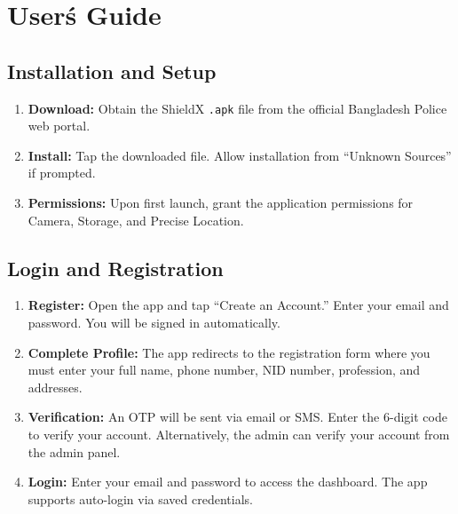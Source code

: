 \documentclass[12pt, a4paper, twoside]{report}
\begin{document}
\chapter{User\'s Guide}
\section*{Installation and Setup}
\begin{enumerate}
    \item[] \textbf{Download:} Obtain the ShieldX \texttt{.apk} file from the official Bangladesh Police web portal.
    \item[] \textbf{Install:} Tap the downloaded file. Allow installation from ``Unknown Sources'' if prompted.
    \item[] \textbf{Permissions:} Upon first launch, grant the application permissions for Camera, Storage, and Precise Location.
\end{enumerate}
\section*{Login and Registration}
\begin{enumerate}
    \item[] \textbf{Register:} Open the app and tap ``Create an Account.'' Enter your email and password. You will be signed in automatically.
    \item[] \textbf{Complete Profile:} The app redirects to the registration form where you must enter your full name, phone number, NID number, profession, and addresses.
    \item[] \textbf{Verification:} An OTP will be sent via email or SMS. Enter the 6-digit code to verify your account. Alternatively, the admin can verify your account from the admin panel.
    \item[] \textbf{Login:} Enter your email and password to access the dashboard. The app supports auto-login via saved credentials.
\end{enumerate}
\end{document}
